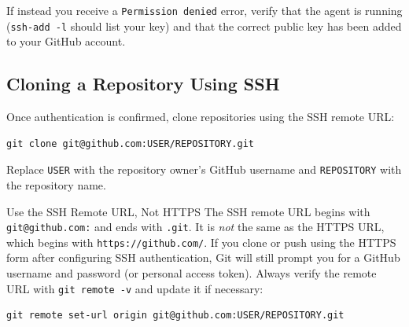 If instead you receive a \texttt{Permission denied} error, verify that the agent is running (\texttt{ssh-add -l} should list your key) and that the correct public key has been added to your GitHub account.

\subsection{Cloning a Repository Using SSH}

Once authentication is confirmed, clone repositories using the SSH remote URL:

\begin{lstlisting}[style=bashstyle, caption={Clone a repository over SSH}]
git clone git@github.com:USER/REPOSITORY.git
\end{lstlisting}

Replace \texttt{USER} with the repository owner's GitHub username and \texttt{REPOSITORY} with the repository name.

\begin{warningbox}{Use the SSH Remote URL, Not HTTPS}
The SSH remote URL begins with \texttt{git@github.com:} and ends with \texttt{.git}. It is \emph{not} the same as the HTTPS URL, which begins with \texttt{https://github.com/}. If you clone or push using the HTTPS form after configuring SSH authentication, Git will still prompt you for a GitHub username and password (or personal access token). Always verify the remote URL with \texttt{git remote -v} and update it if necessary:

\begin{lstlisting}[style=bashstyle]
git remote set-url origin git@github.com:USER/REPOSITORY.git
\end{lstlisting}
\end{warningbox}

